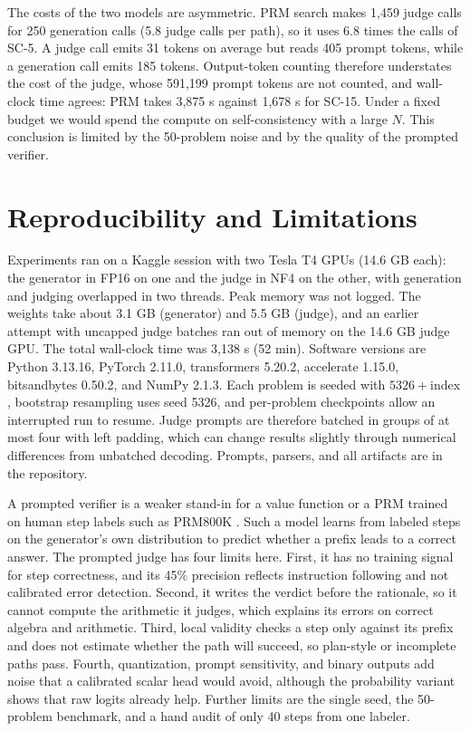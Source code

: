 \documentclass{article}
\begin{document}
The costs of the two models are asymmetric. PRM search makes 1,459 judge calls for 250 generation calls (5.8 judge calls per path), so it uses 6.8 times the calls of SC-5. A judge call emits 31 tokens on average but reads 405 prompt tokens, while a generation call emits 185 tokens. Output-token counting therefore understates the cost of the judge, whose 591,199 prompt tokens are not counted, and wall-clock time agrees: PRM takes 3,875 s against 1,678 s for SC-15. Under a fixed budget we would spend the compute on self-consistency with a large $N$. This conclusion is limited by the 50-problem noise and by the quality of the prompted verifier.

\section{Reproducibility and Limitations}
Experiments ran on a Kaggle session with two Tesla T4 GPUs (14.6 GB each): the generator in FP16 on one and the judge in NF4 on the other, with generation and judging overlapped in two threads. Peak memory was not logged. The weights take about 3.1 GB (generator) and 5.5 GB (judge), and an earlier attempt with uncapped judge batches ran out of memory on the 14.6 GB judge GPU. The total wall-clock time was 3,138 s (52 min). Software versions are Python 3.13.16, PyTorch 2.11.0, transformers 5.20.2, accelerate 1.15.0, bitsandbytes 0.50.2, and NumPy 2.1.3. Each problem is seeded with $5326+\text{index}$, bootstrap resampling uses seed 5326, and per-problem checkpoints allow an interrupted run to resume. Judge prompts are therefore batched in groups of at most four with left padding, which can change results slightly through numerical differences from unbatched decoding. Prompts, parsers, and all artifacts are in the repository.

A prompted verifier is a weaker stand-in for a value function or a PRM trained on human step labels such as PRM800K \citep{lightman2023verify}. Such a model learns from labeled steps on the generator's own distribution to predict whether a prefix leads to a correct answer. The prompted judge has four limits here. First, it has no training signal for step correctness, and its 45\% precision reflects instruction following and not calibrated error detection. Second, it writes the verdict before the rationale, so it cannot compute the arithmetic it judges, which explains its errors on correct algebra and arithmetic. Third, local validity checks a step only against its prefix and does not estimate whether the path will succeed, so plan-style or incomplete paths pass. Fourth, quantization, prompt sensitivity, and binary outputs add noise that a calibrated scalar head would avoid, although the probability variant shows that raw logits already help. Further limits are the single seed, the 50-problem benchmark, and a hand audit of only 40 steps from one labeler.
\end{document}

